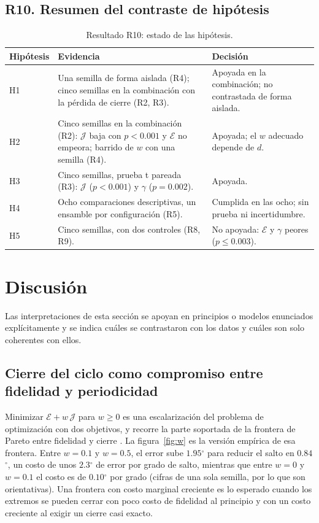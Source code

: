 \documentclass[11pt,a4paper]{article}
\newcommand{\gr}{$^{\circ}$}
\begin{document}
\subsection{R10. Resumen del contraste de hipótesis}
\label{sec:r10}

\begin{table}[h]
\centering\small
\begin{tabularx}{\textwidth}{@{}l>{\raggedright\arraybackslash}X>{\raggedright\arraybackslash}p{4.6cm}@{}}
\toprule
Hipótesis & Evidencia & Decisión \\
\midrule
H1 & Una semilla de forma aislada (R4); cinco semillas en la combinación con la pérdida de cierre (R2, R3). & Apoyada en la combinación; no contrastada de forma aislada. \\
H2 & Cinco semillas en la combinación (R2): $\mathcal J$ baja con $p<0.001$ y $\mathcal E$ no empeora; barrido de $w$ con una semilla (R4). & Apoyada; el $w$ adecuado depende de $d$. \\
H3 & Cinco semillas, prueba t pareada (R3): $\mathcal J$ ($p<0.001$) y $\gamma$ ($p=0.002$). & Apoyada. \\
H4 & Ocho comparaciones descriptivas, un ensamble por configuración (R5). & Cumplida en las ocho; sin prueba ni incertidumbre. \\
H5 & Cinco semillas, con dos controles (R8, R9). & No apoyada: $\mathcal E$ y $\gamma$ peores ($p\le0.003$). \\
\bottomrule
\end{tabularx}
\caption{Resultado R10: estado de las hipótesis.}
\label{tab:hipres}
\end{table}

\section{Discusión}
\label{sec:discusion}

Las interpretaciones de esta sección se apoyan en principios o modelos enunciados explícitamente y se indica cuáles se contrastaron con los datos y cuáles son solo coherentes con ellos.

\subsection{Cierre del ciclo como compromiso entre fidelidad y periodicidad}

Minimizar $\mathcal E+w\,\mathcal J$ para $w\ge0$ es una escalarización del problema de optimización con dos objetivos, y recorre la parte soportada de la frontera de Pareto entre fidelidad y cierre \cite{boyd2004}. La figura~\ref{fig:w} es la versión empírica de esa frontera. Entre $w=0.1$ y $w=0.5$, el error sube $1.95$\gr{} para reducir el salto en $0.84$\gr{}, un costo de unos $2.3$\gr{} de error por grado de salto, mientras que entre $w=0$ y $w=0.1$ el costo es de $0.10$\gr{} por grado (cifras de una sola semilla, por lo que son orientativas). Una frontera con costo marginal creciente es lo esperado cuando los extremos se pueden cerrar con poco costo de fidelidad al principio y con un costo creciente al exigir un cierre casi exacto.
\end{document}
